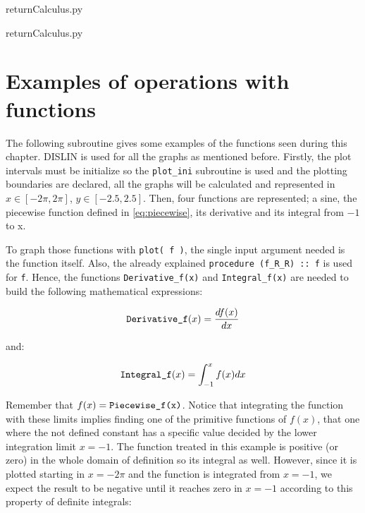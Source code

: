 \vspace{0.5cm}
\lstpython
{}
{return}{Calculus.py}
\lstfor

\vspace{0.5cm}
\lstpython
{}
{return}{Calculus.py}
\lstfor

 



    \newpage 
    \section{Examples of operations with functions}

The following subroutine gives some examples of the functions seen during this chapter. 
DISLIN is used for all the graphs as mentioned before. Firstly, the plot intervals must 
be initialize so the \texttt{plot\_ini} subroutine is used and the plotting boundaries 
are declared, all the graphs will be calculated and represented in 
$x\in \left[ -2\pi, 2\pi \right]$, 
$y\in \left[ -2.5, 2.5 \right]$.
Then, four functions are represented; a sine, 
the piecewise function defined in \ref{eq:piecewise},
its derivative and 
its integral from $-1$ to x. 

To graph those functions with \texttt{plot( f )}, the single input argument needed is the function itself.  
Also, the already explained \texttt{procedure (f\_R\_R) :: f} is used for \texttt{f}. Hence,
the functions \texttt{Derivative\_f(x)} and \texttt{Integral\_f(x)} are needed to 
build the following mathematical expressions: 

$$
\text{\texttt{Derivative\_f}}(x) = \frac{df(x)}{dx}
$$

and:

$$
\text{\texttt{Integral\_f}}(x) = \int_{-1}^{x} f(x) dx
$$

Remember that $f(x) = \text{\texttt{Piecewise\_f(x)}}$. Notice that integrating the function with these limits implies finding one of the primitive functions of $f(x)$, that one where the not defined constant has a specific value decided by the lower integration limit $x=-1$. The function treated in this example is positive (or zero) in the whole domain of definition so its integral as well. However, since it is plotted starting in $x = -2\pi$ and the function is integrated from $x=-1$, we expect the result to be negative until it reaches zero in $x=-1$ according to this property of definite integrals:

